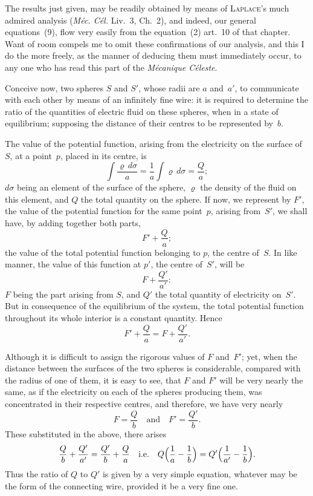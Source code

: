 \documentclass[11pt,notitlepage]{amsart}
\let\Person\textsc
\let\Title\textit
\renewcommand{\rho}{\varrho}
\begin{document}
The results just given, may be readily obtained by means of \Person{Laplace}'s
much admired analysis
(\Title{M\'ec. C\'el.} Liv.~3, Ch.~2), and indeed, our general
equations~(9), flow very easily from the equation~(2) art.~10 of that chapter.
Want of room compels me to omit these confirmations of our analysis, and
this I do the more freely, as the manner of deducing them must immediately
occur, to any one who has read this part of the \Title{M\'ecanique C\'eleste}.

Conceive now, two spheres $S$ and $S'$, whose radii are $a$ and~$a'$, to
communicate with each other by means of an infinitely fine wire: it is required
to determine the ratio of the quantities of electric fluid on these spheres,
when in a state of equilibrium; supposing the distance of their centres to be
represented by~$b$.

The value of the potential function, arising from the electricity on the
surface of~$S$, at a point~$p$, placed in its centre, is
\[
\int\frac{\rho\,d\sigma}{a}=\frac1a\int\rho\,d\sigma=\frac{Q}{a};
\]
$d\sigma$ being an element of the surface of the sphere,
$\rho$ the density of the fluid
on this element, and $Q$ the total quantity on the sphere. If now, we
represent by $F'$, the value of the potential function for the same point~$p$,
arising from~$S'$, we shall have, by adding together both parts,
\[
F'+\frac{Q}{a};
\]
the value of the total potential function belonging to $p$, the centre of~$S$.
In
like manner, the value of this function at $p'$, the centre of~$S'$, will be
\[
F+\frac{Q'}{a'}:
\]
$F$ being the part arising from $S$,
and $Q'$ the total quantity of electricity on~$S'$.
But in consequence of the equilibrium of the system,
the total potential function
throughout its whole interior is a constant quantity. Hence
\[
F'+\frac{Q}{a}
=F+\frac{Q'}{a'}.
\]

Although it is difficult to assign the rigorous values of $F$ and~$F'$;
yet, when the distance between the surfaces of the two spheres is considerable,
compared with the radius of one of them, it is easy to see, that
$F$ and $F'$ will be very nearly the same, as if the electricity on each of the
spheres producing them, was concentrated in their respective centres, and
therefore, we have very nearly
\[
F=\frac{Q}{b}
\quad\text{and}\quad
F'=\frac{Q'}{b}.
\]
These substituted in the above, there arises
\[
\frac{Q}{b}+\frac{Q'}{a'}=\frac{Q'}{b}+\frac{Q}{a}
\quad\text{i.e.}\quad
Q\Bigl(\frac1a-\frac1b\Bigr)=Q'\Bigl(\frac1{a'}-\frac1b\Bigr).
\]
Thus the ratio of $Q$ to $Q'$ is given by a very simple equation, whatever
may be the form of the connecting wire, provided it be a very fine one.
\end{document}
